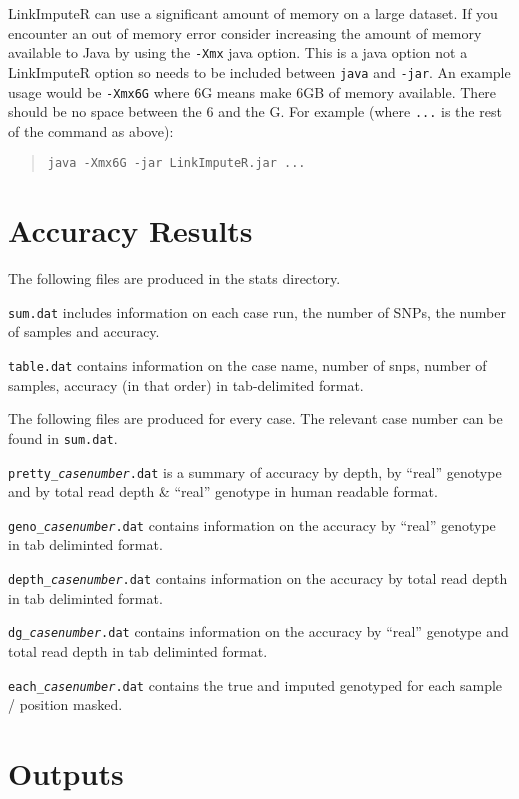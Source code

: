 \documentclass[10pt]{report}
\begin{document}
LinkImputeR can use a significant amount of memory on a large dataset.  If you encounter an out of memory error consider increasing the amount of memory available to Java by using the \texttt{-Xmx} java option.  This is a java option not a LinkImputeR option so needs to be included between \texttt{java} and \texttt{-jar}.  An example usage would be \texttt{-Xmx6G} where 6G means make 6GB of memory available.  There should be no space between the 6 and the G.  For example (where \texttt{...} is the rest of the command as above):
\begin{quote}
\texttt{java -Xmx6G -jar LinkImputeR.jar ...}
\end{quote}

\section{Accuracy Results}
\label{sec:accres}
The following files are produced in the stats directory.

\texttt{sum.dat} includes information on each case run, the number of SNPs, the number of samples and accuracy.

\texttt{table.dat} contains information on the case name, number of snps, number of samples, accuracy (in that order) in tab-delimited format.

The following files are produced for every case.  The relevant case number can be found in \texttt{sum.dat}.

\texttt{pretty\_\textit{casenumber}.dat} is a summary of accuracy by depth, by ``real'' genotype and by total read depth \& ``real'' genotype in human readable format.

\texttt{geno\_\textit{casenumber}.dat} contains information on the accuracy by ``real'' genotype in tab deliminted format.

\texttt{depth\_\textit{casenumber}.dat} contains information on the accuracy by total read depth in tab deliminted format.

\texttt{dg\_\textit{casenumber}.dat} contains information on the accuracy by ``real'' genotype and total read depth in tab deliminted format.

\texttt{each\_\textit{casenumber}.dat} contains the true and imputed genotyped for each sample / position masked.

\section{Outputs}
\end{document}
